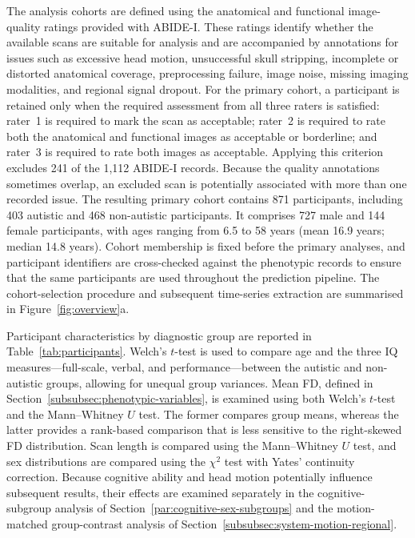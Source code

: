 The analysis cohorts are defined using the anatomical and functional image-quality ratings
provided with ABIDE-I. These ratings identify whether the available scans are suitable for
analysis and are accompanied by annotations for issues such as excessive head motion,
unsuccessful skull stripping, incomplete or distorted anatomical coverage, preprocessing
failure, image noise, missing imaging modalities, and regional signal dropout. For the
primary cohort, a participant is retained only when the required assessment from all three
raters is satisfied: rater~1 is required to mark the scan as acceptable; rater~2 is required to rate both the
anatomical and functional images as acceptable or borderline; and rater~3 is required to rate both
images as acceptable. Applying this criterion excludes 241 of the 1,112 ABIDE-I records.
Because the quality annotations sometimes overlap, an excluded scan is potentially associated with more
than one recorded issue. The resulting primary cohort contains 871 participants, including
403 autistic and 468 non-autistic participants. It comprises 727 male and 144 female
participants, with ages ranging from 6.5 to 58 years (mean 16.9 years; median 14.8 years).
Cohort membership is fixed before the primary analyses, and participant identifiers are
cross-checked against the phenotypic records to ensure that the same participants are used
throughout the prediction pipeline. The cohort-selection procedure and subsequent
time-series extraction are summarised in Figure~\ref{fig:overview}a.

Participant characteristics by diagnostic group are reported in
Table~\ref{tab:participants}. Welch's $t$-test is used to compare age and the three IQ measures---full-scale, verbal, and performance---between the
autistic and non-autistic groups, allowing for unequal group variances. Mean FD, defined in Section~\ref{subsubsec:phenotypic-variables}, is examined using both Welch's
$t$-test and the Mann--Whitney $U$ test. The former compares group means, whereas the latter
provides a rank-based comparison that is less sensitive to the right-skewed FD
distribution. Scan length is compared using the Mann--Whitney $U$ test, and sex
distributions are compared using the $\chi^2$ test with Yates' continuity correction.
Because cognitive ability and head motion potentially influence subsequent results, their effects
are examined separately in the cognitive-subgroup analysis of
Section~\ref{par:cognitive-sex-subgroups} and the motion-matched group-contrast analysis of
Section~\ref{subsubsec:system-motion-regional}.

